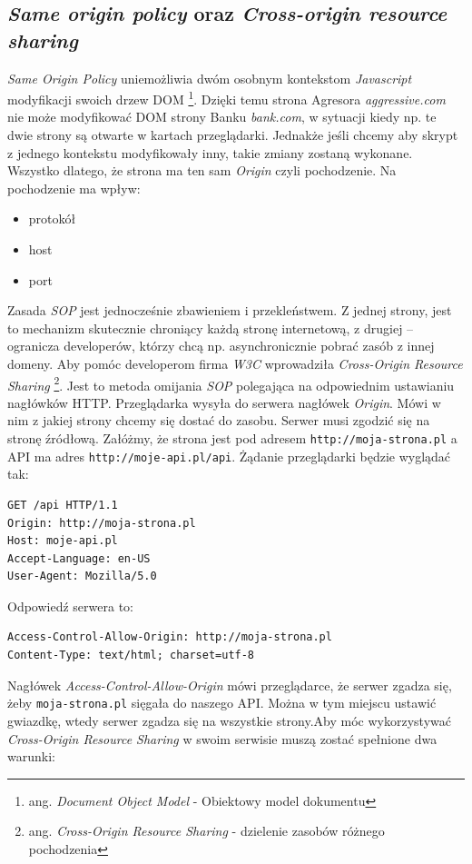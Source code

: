 \documentclass[openright]{xmgr}
\begin{document}
\subsection{\textit{Same origin policy} oraz \textit{Cross-origin resource sharing}} 
\textit{Same Origin Policy} uniemożliwia dwóm osobnym kontekstom \textit{Javascript} modyfikacji swoich drzew DOM \footnote{ang. \textit{Document Object Model} - Obiektowy model dokumentu }. Dzięki temu strona Agresora \textit{aggressive.com} nie może modyfikować DOM strony Banku \textit{ bank.com}, w sytuacji kiedy np. te dwie strony są otwarte w kartach przeglądarki. Jednakże jeśli chcemy aby skrypt z jednego kontekstu modyfikowały inny, takie zmiany zostaną wykonane. Wszystko dlatego, że strona ma ten sam \textit{Origin} czyli pochodzenie. Na pochodzenie ma wpływ:
\begin{itemize}
\item protokół
\item host
\item port
\end{itemize}
Zasada \textit{SOP} jest jednocześnie zbawieniem i przekleństwem. Z jednej strony, jest to mechanizm skutecznie chroniący każdą stronę internetową, z drugiej – ogranicza developerów, którzy chcą np. asynchronicznie pobrać zasób z innej domeny. Aby pomóc developerom firma \textit{W3C} wprowadziła \textit{Cross-Origin Resource Sharing} \footnote{ang. \textit{Cross-Origin Resource Sharing} - dzielenie zasobów różnego pochodzenia}. Jest to metoda omijania \textit{SOP} polegająca na odpowiednim ustawianiu nagłówków HTTP. Przeglądarka wysyła do serwera nagłówek \textit{Origin}. Mówi w nim z jakiej strony chcemy się dostać do zasobu. Serwer musi zgodzić się na stronę źródłową. Załóżmy, że strona jest pod adresem \verb|http://moja-strona.pl| a API ma adres \verb|http://moje-api.pl/api|. Żądanie przeglądarki będzie wyglądać tak:
\begin{verbatim}
GET /api HTTP/1.1
Origin: http://moja-strona.pl
Host: moje-api.pl
Accept-Language: en-US
User-Agent: Mozilla/5.0
\end{verbatim}
Odpowiedź serwera to:
\begin{verbatim}
Access-Control-Allow-Origin: http://moja-strona.pl
Content-Type: text/html; charset=utf-8
\end{verbatim}
Nagłówek \textit{Access-Control-Allow-Origin} mówi przeglądarce, że serwer zgadza się, żeby \verb|moja-strona.pl| sięgała do naszego API. Można w tym miejscu ustawić gwiazdkę, wtedy serwer zgadza się na wszystkie strony.Aby móc wykorzystywać \textit{Cross-Origin Resource Sharing} w swoim serwisie muszą zostać spełnione dwa  warunki:
\end{document}
